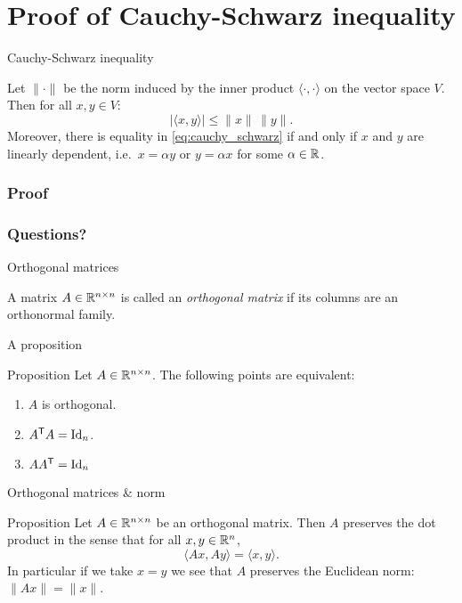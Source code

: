 \documentclass{beamer}
\begin{document}
\section{Proof of Cauchy-Schwarz inequality}
\begin{frame}[t]{Cauchy-Schwarz inequality}
	\grid

	\vspace{-0.4cm}
\begin{theorem}
	Let $\| \cdot \|$ be the norm induced by the inner product $\langle \cdot , \cdot \rangle$ on the vector space $V$. Then for all $x,y \in V$:
	\begin{equation}\label{eq:cauchy_schwarz}
	| \langle x,y \rangle | \leq \|x\| \, \|y\|.
	\end{equation}
	Moreover, there is equality in \eqref{eq:cauchy_schwarz} if and only if $x$ and $y$ are linearly dependent, i.e.\ $x = \alpha y$ or $y = \alpha x$ for some $\alpha \in \mathbb{R}$.
\end{theorem}
\end{frame}
\begin{frame}[t]
	\frametitle{Proof}
	\grid

	\pause
\end{frame}

\appendix
\backupbegin
\begin{frame}[t]
	\frametitle{Questions?}
	\grid

	\pause
\end{frame}
\begin{frame}[t]{Orthogonal matrices}
	\grid

	\begin{definition}
		A matrix $A \in \mathbb{R}^{n \times n}$ is called an \emph{orthogonal matrix} if its columns are an orthonormal family.
	\end{definition}
\end{frame}

\begin{frame}[t]{A proposition}
	\grid

	\vspace{-0.4cm}
	\begin{block}{Proposition}
		Let $A \in \mathbb{R}^{n \times n}$. The following points are equivalent:
		\begin{enumerate}
			\item $A$ is orthogonal.
			\item $A^{{\sf T}} A = {{\rm Id}}_n$.
			\item $A A^{{\sf T}} = {{\rm Id}}_n$
		\end{enumerate}
	\end{block}
\end{frame}

\begin{frame}[t]{Orthogonal matrices \& norm}
	\grid

	\vspace{-0.4cm}
	\begin{block}{Proposition}
	Let $A \in \mathbb{R}^{n \times n}$ be an orthogonal matrix. Then $A$ preserves the dot product in the sense that for all $x,y \in \mathbb{R}^n$,
	$$
	\langle Ax, Ay \rangle = \langle x,y\rangle.
	$$
	In particular if we take $x=y$ we see that $A$ preserves the Euclidean norm: $\|Ax\| = \|x\|$.
\end{block}
\end{frame}
\backupend
\end{document}
